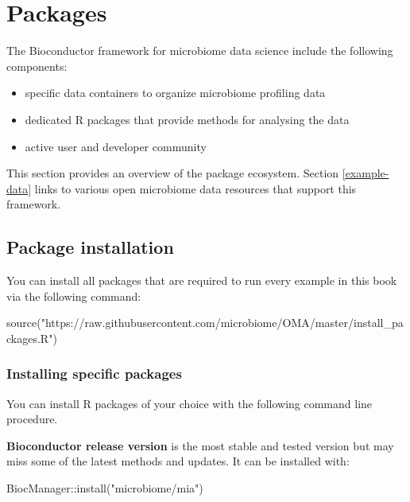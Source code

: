 \documentclass[
]{book}
\newenvironment{Shaded}{\begin{snugshade}}{\end{snugshade}}
\newcommand{\FunctionTok}[1]{\textcolor[rgb]{0.00,0.00,0.00}{#1}}
\newcommand{\NormalTok}[1]{#1}
\newcommand{\SpecialCharTok}[1]{\textcolor[rgb]{0.00,0.00,0.00}{#1}}
\newcommand{\StringTok}[1]{\textcolor[rgb]{0.31,0.60,0.02}{#1}}
\providecommand{\tightlist}{%
  \setlength{\itemsep}{0pt}\setlength{\parskip}{0pt}}
\begin{document}
\hypertarget{packages}{%
\chapter{Packages}\label{packages}}

The Bioconductor framework for microbiome data science include the following components:

\begin{itemize}
\tightlist
\item
  specific data containers to organize microbiome profiling data
\item
  dedicated R packages that provide methods for analysing the data
\item
  active user and developer community
\end{itemize}

This section provides an overview of the package ecosystem. Section
\ref{example-data} links to various open microbiome data resources
that support this framework.

\hypertarget{package-installation}{%
\section{Package installation}\label{package-installation}}

You can install all packages that are required to run every example in this book via the following command:

\begin{Shaded}
\begin{Highlighting}[]
\FunctionTok{source}\NormalTok{(}\StringTok{"https://raw.githubusercontent.com/microbiome/OMA/master/install\_packages.R"}\NormalTok{)}
\end{Highlighting}
\end{Shaded}

\hypertarget{packages}{%
\subsection{Installing specific packages}\label{packages}}

You can install R packages of your choice with the following command
line procedure.

\textbf{Bioconductor release version} is the most stable and tested version
but may miss some of the latest methods and updates. It can be
installed with:

\begin{Shaded}
\begin{Highlighting}[]
\NormalTok{BiocManager}\SpecialCharTok{::}\FunctionTok{install}\NormalTok{(}\StringTok{"microbiome/mia"}\NormalTok{)}
\end{Highlighting}
\end{Shaded}
\end{document}
